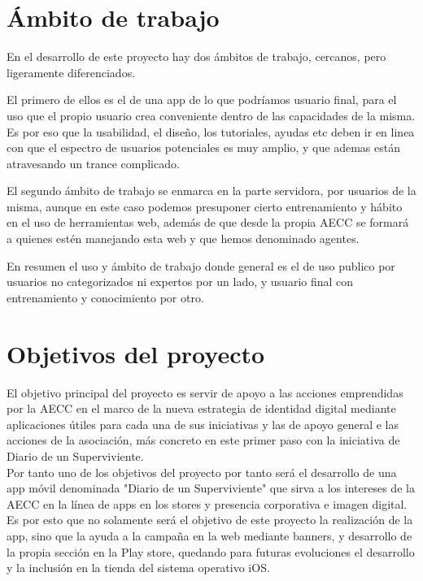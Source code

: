 \documentclass[../pfc.tex]{subfiles}
\begin{document}
\section{Ámbito de trabajo}

En el desarrollo de este proyecto hay dos ámbitos de trabajo, cercanos, pero ligeramente diferenciados.

El primero de ellos es el de una app de lo que podríamos usuario final, para el uso que el propio usuario crea conveniente dentro de las capacidades de la misma. Es por eso que la usabilidad, el diseño, los tutoriales, ayudas etc deben ir en linea con que el espectro de usuarios potenciales es muy amplio, y que ademas están atravesando un trance complicado.

El segundo ámbito de trabajo se enmarca en la parte servidora, por usuarios de la misma, aunque en este caso podemos presuponer cierto entrenamiento y hábito en el uso de herramientas web, además de que desde la propia AECC se formará a quienes estén manejando esta web y que hemos denominado agentes.

En resumen el uso y ámbito de trabajo donde general es el de uso publico por usuarios no categorizados ni expertos por un lado, y usuario final con entrenamiento y conocimiento por otro.

\section{Objetivos del proyecto}
El objetivo principal del proyecto es servir de apoyo a las acciones emprendidas por la AECC en el marco de la nueva estrategia de identidad digital mediante aplicaciones útiles para cada una de sus iniciativas y las de apoyo general e las acciones de la asociación, más concreto en este primer paso con la iniciativa de Diario de un Superviviente.\\

Por tanto uno de los objetivos del proyecto por tanto será el desarrollo de una app móvil denominada "Diario de un Superviviente" que sirva a los intereses de la AECC en la línea de apps en los stores y presencia corporativa e imagen digital. Es por esto que no solamente será el objetivo de este proyecto la realización de la app, sino que la ayuda a la campaña en la web mediante banners, y desarrollo de la propia sección en la Play store, quedando para futuras evoluciones el desarrollo y la inclusión en la tienda del sistema operativo iOS.\\
\end{document}
